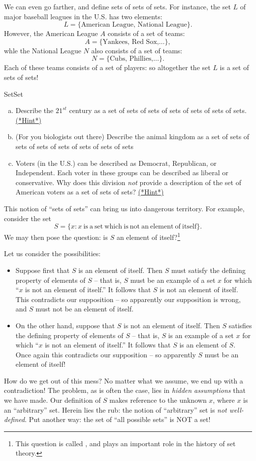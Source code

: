 We can even go farther, and define sets of sets of sets. For instance, the set $L$ of major baseball leagues in the U.S. has two elements: 
\[L = \{ \text{American League, National League} \}. \]
However, the American League $A$ consists of a set of teams:
\[A = \{ \text{Yankees, Red Sox,} \ldots \}, \]
whle the National League $N$ also consists of a set of teams:
\[N = \{ \text{Cubs, Phillies,} \ldots \}. \]
Each of these teams consists of a set of players: so altogether the set $L$ is a set of sets of sets!

\begin{exercise}{SetSet}
\begin{enumerate}[(a)]
\item
Describe the $21^{st}$ century as a set of sets of sets of sets of sets of sets of sets.
\hyperref[sec:set_chapter:hints]{(*Hint*)}
\item
(For you biologists out there)  Describe the animal kingdom as a set of sets of sets of sets of sets of sets of sets of sets
\item
Voters (in the U.S.) can be described as Democrat, Republican, or Independent.  Each voter in these groups can be described as liberal or conservative. Why does this division \emph{not} provide a description of  the set of American voters as a set of sets of sets? 
\hyperref[sec:set_chapter:hints]{(*Hint*)}
\end{enumerate}
\end{exercise}

This notion of ``sets of sets'' can bring us into dangerous territory. For example, consider the set 
\[S = \{ x : x \mathrm{~is~a~set~which~is~not~an~element~of~itself} \}. \]
We may then pose the question: is $S$ an element of itself?\footnote{This question is called , and plays an important role in the history of set theory.} 

Let us consider the possibilities:
\begin{itemize}
\item
 Suppose first that $S$ is an element of itself. 
Then $S$ must satisfy the defining property of elements of  $S$ -- that is, $S$ must be an example of a set $x$ for which ``$x$ is  not an element of itself.'' It follows that $S$ is not an element of itself.  This contradicts our supposition -- so apparently our supposition is wrong, and $S$ must not be an element of itself.
\item
On the other hand, suppose that $S$ is not an element of itself. Then $S$ satisfies the defining property of elements of  $S$ -- that is, $S$ is an example of a set $x$ for which ``$x$ is  not an element of itself.'' It follows that $S$ is an element of $S$.  Once again this contradicts our supposition -- so apparently $S$ must be an element of itself!
\end{itemize}
How do we get out of this mess? No matter what we assume, we end up with a contradiction! The problem, as is often the case, lies in  \emph{hidden assumptions} that we have made. Our definition of $S$ makes reference to the unknown $x$, where $x$ is an ``arbitrary'' set. Herein lies the rub:  the notion of ``arbitrary'' set is \emph{not well-defined}. Put another way: the set of ``all possible sets'' is NOT a set!

